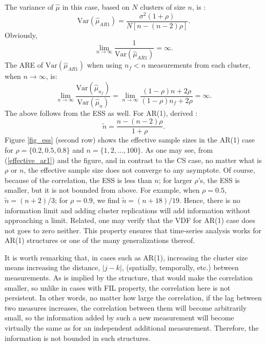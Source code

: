 \documentclass[11pt,a5paper,twoside]{book}
\begin{document}
The variance of $\widehat{\mu}$ in this case, based on $N$ clusters of size $n$, is \cite{Lisa2016_3}:
\begin{equation}
\label{var_mu_ar1}
\mathrm{Var}(\widehat{\mu}_{AR1})= \frac{\sigma^2 (1+\rho)}{N [n-(n-2)\rho]}.
\end{equation}
Obviously, 
\begin{equation}
\label{info_ar1}
\lim_{n\rightarrow\infty} \frac{1}{\mathrm{Var}(\widehat{\mu}_{AR1})} = \infty.
\end{equation}
The ARE of $\mathrm{Var}(\widehat{\mu}_{AR1})$ when using $n_f <n$ measurements from each cluster, when $n\rightarrow\infty$, is:
\begin{equation}
\label{eff_ar1}
\lim_{n\rightarrow\infty} \frac{\mathrm{Var}(\widehat{\mu}_{n_f})}{\mathrm{Var}(\widehat{\mu}_n)} = \lim_{n\rightarrow\infty} \frac{(1-\rho) n + 2\rho}{(1-\rho) n _f + 2\rho} = \infty.
\end{equation}
The above follows from the ESS as well. For AR(1), derived \cite{faes2009}:
\begin{equation}
\label{effective_ar1}
\widetilde{n}=\frac{n-(n-2)\rho}{1+\rho}.
\end{equation}
Figure \ref{fig_ess} (second row) shows the effective sample sizes in the AR(1) case for $\rho=\{0.2,0.5,0.8\}$ and $n=\{1,2,\ldots,100\}$. As one may see, from (\ref{effective_ar1}) and the figure, and in contrast to the CS case, no matter what is $\rho$ or $n$, the effective sample size does not converge to any asymptote. Of course, because of the correlation, the ESS is less than $n$; for larger $\rho$'s, the ESS is smaller, but it is not bounded from above. For example, when $\rho=0.5$, $\widetilde{n}=(n+2)/3$; for $\rho=0.9$, we find $\widetilde{n}=(n+18)/19$. Hence, there is no information limit and adding cluster replications will add information without approaching a limit. Related, one may  verify that the VDF for AR(1) case does not goes to zero neither. This property ensures that time-series analysis works for AR(1) structures or one of the many generalizations thereof.

It is worth remarking that, in cases such as AR(1), increasing the cluster size means increasing the distance, $|j-k|$, (spatially, temporally, etc.) between measurements. As is implied by the structure, that would make the correlation smaller, so unlike in cases with FIL property, the correlation here is not persistent. In other words, no matter how large the correlation, if the lag between two measures increases, the correlation between them will become arbitrarily small, so the information added by such a new measurement will become virtually the same as for an independent additional measurement. Therefore, the information is not bounded in such structures.
\end{document}
